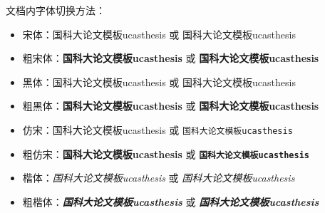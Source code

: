{文档内字体切换方法：
    \begin{itemize}
        \item 宋体：国科大论文模板ucasthesis 或 \textrm{国科大论文模板ucasthesis}
        \item 粗宋体：{\bfseries 国科大论文模板ucasthesis} 或 \textbf{国科大论文模板ucasthesis}
        \item 黑体：{\sffamily 国科大论文模板ucasthesis} 或 \textsf{国科大论文模板ucasthesis}
        \item 粗黑体：{\bfseries\sffamily 国科大论文模板ucasthesis} 或 \textsf{\bfseries 国科大论文模板ucasthesis}
        \item 仿宋：{\ttfamily 国科大论文模板ucasthesis} 或 \texttt{国科大论文模板ucasthesis}
        \item 粗仿宋：{\bfseries\ttfamily 国科大论文模板ucasthesis} 或 \texttt{\bfseries 国科大论文模板ucasthesis}
        \item 楷体：{\itshape 国科大论文模板ucasthesis} 或 \textit{国科大论文模板ucasthesis}
        \item 粗楷体：{\bfseries\itshape 国科大论文模板ucasthesis} 或 \textit{\bfseries 国科大论文模板ucasthesis}
    \end{itemize}

\let\cleardoublepage\relax
}
